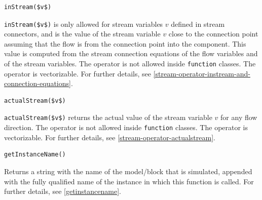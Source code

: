 \begin{operatordefinition}[inStream]
\begin{synopsis}\begin{lstlisting}
inStream($v$)
\end{lstlisting}\end{synopsis}
\begin{semantics}
\lstinline!inStream($v$)! is only allowed for stream variables $v$ defined in stream connectors, and is the value of the stream variable $v$ close to the connection point assuming that the flow is from the connection point into the component.
This value is computed from the stream connection equations of the flow variables and of the stream variables.
The operator is not allowed inside \lstinline!function! classes.
The operator is vectorizable.
For further details, see \cref{stream-operator-instream-and-connection-equations}.
\end{semantics}
\end{operatordefinition}

\begin{operatordefinition}[actualStream]
\begin{synopsis}\begin{lstlisting}
actualStream($v$)
\end{lstlisting}\end{synopsis}
\begin{semantics}
\lstinline!actualStream($v$)! returns the actual value of the stream variable $v$ for any flow direction.
The operator is not allowed inside \lstinline!function! classes.
The operator is vectorizable.
For further details, see \cref{stream-operator-actualstream}.
\end{semantics}
\end{operatordefinition}

\begin{operatordefinition}[getInstanceName]
\begin{synopsis}\begin{lstlisting}
getInstanceName()
\end{lstlisting}\end{synopsis}
\begin{semantics}
Returns a string with the name of the model/block that is simulated, appended with the fully qualified name of the instance in which this function is called.
For further details, see \cref{getinstancename}.
\end{semantics}
\end{operatordefinition}

